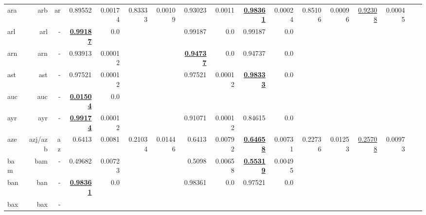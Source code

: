\documentclass[11pt]{article}
\begin{document}
\begin{table*}[h]
{\begin{tabular}{lrrrrrrrrrrrrrrrr}
ara         & arb         & ar         & 0.89552         & 0.00174         & 0.83333         & 0.00109         & 0.93023         & 0.0011         & \textbf{\underline{0.98361}}         & 0.00024         & 0.85106         & 0.00096         & \underline{0.92308}         & 0.00045         \\
arl         & arl         & -         & \textbf{\underline{0.99187}}         & 0.0         &          &          & 0.99187         & 0.0         & 0.99187         & 0.0         &          &          &          &          \\
arn         & arn         & -         & 0.93913         & 0.00012         &          &          & \textbf{\underline{0.94737}}         & 0.0         & 0.94737         & 0.0         &          &          &          &          \\
ast         & ast         & -         & 0.97521         & 0.00012         &          &          & 0.97521         & 0.00012         & \textbf{\underline{0.98333}}         & 0.0         &          &          &          &          \\
auc         & auc         & -         & \textbf{\underline{0.01504}}         & 0.0         &          &          &          &          &          &          &          &          &          &          \\
ayr         & ayr         & -         & \textbf{\underline{0.99174}}         & 0.00012         &          &          & 0.91071         & 0.00012         & 0.84615         & 0.0         &          &          &          &          \\
aze         & azj/azb         & az         & 0.6413         & 0.0081         & 0.21034         & 0.01446         & 0.6413         & 0.00792         & \textbf{\underline{0.64658}}         & 0.00731         & 0.22736         & 0.01253         & \underline{0.25708}         & 0.00973         \\
bam         & bam         & -         & 0.49682         & 0.00723         &          &          & 0.5098         & 0.00658         & \textbf{\underline{0.55319}}         & 0.00495         &          &          &          &          \\
ban         & ban         & -         & \textbf{\underline{0.98361}}         & 0.0         &          &          & 0.98361         & 0.0         & 0.97521         & 0.0         &          &          &          &          \\
bax         & bax         & -         &          &          &          &          &          &          &          &          &          &          &          &          \\

\end{tabular}}
\end{table*}
\end{document}
